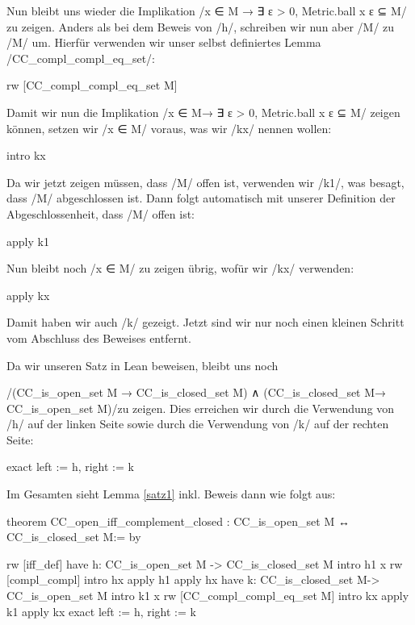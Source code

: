 \documentclass[10pt]{article}
\begin{document}
\noindent Nun bleibt uns wieder die Implikation \lean/x ∈ M → ∃ ε > 0, Metric.ball x ε ⊆ M/ zu zeigen. Anders als bei dem Beweis von \lean/h/, schreiben wir nun aber \lean/M/ zu \lean/M\compl\compl/ um. Hierfür verwenden wir unser selbst definiertes Lemma \lean/CC_compl\_compl\_eq\_set/:
\begin{leancode}
  rw [CC_compl_compl_eq_set M] 
\end{leancode}
\noindent Damit wir nun die Implikation \lean/x ∈ M\compl\compl → ∃ ε > 0, Metric.ball x ε ⊆ M\compl\compl/ zeigen können, setzen wir \lean/x ∈ M\compl\compl/ voraus, was wir \lean/kx/ nennen wollen:
\begin{leancode}
  intro kx
\end{leancode}
\noindent Da wir jetzt zeigen müssen, dass \lean/M\compl\compl/ offen ist, verwenden wir \lean/k1/, was besagt, dass \lean/M\compl/ abgeschlossen ist. Dann folgt automatisch mit unserer Definition der Abgeschlossenheit, dass \lean/M\compl\compl/ offen ist:
\begin{leancode}
  apply k1
\end{leancode}
\noindent Nun bleibt noch \lean/x ∈ M\compl\compl/ zu zeigen übrig, wofür wir \lean/kx/ verwenden:
\begin{leancode}
  apply kx 
\end{leancode}
\noindent Damit haben wir auch \lean/k/ gezeigt. Jetzt sind wir nur noch einen kleinen Schritt vom Abschluss des Beweises entfernt.\par

\noindent Da wir unseren Satz in Lean beweisen, bleibt uns noch\par

\noindent \lean/(CC_is_open_set M → CC_is_closed_set M\compl) ∧ (CC_is_closed_set M\compl → CC_is_open_set M)/zu zeigen. Dies erreichen wir durch die Verwendung von \lean/h/ auf der linken Seite sowie durch die Verwendung von \lean/k/ auf der rechten Seite:
\begin{leancode}
  exact { left := h, right := k }
\end{leancode}
\noindent Im Gesamten sieht Lemma \ref{satz1} inkl. Beweis dann wie folgt aus:
\begin{leancode}
theorem CC_open_iff_complement_closed :
  CC_is_open_set M ↔ CC_is_closed_set M\compl := by

  rw [iff_def]
  have h: CC_is_open_set M -> CC_is_closed_set M\compl 
  intro h1 x
  rw [compl_compl]
  intro hx
  apply h1
  apply hx
  have k: CC_is_closed_set M\compl -> CC_is_open_set M
  intro k1 x
  rw [CC_compl_compl_eq_set M] 
  intro kx
  apply k1
  apply kx
  exact { left := h, right := k }
\end{leancode}
\fi %
\end{document}

